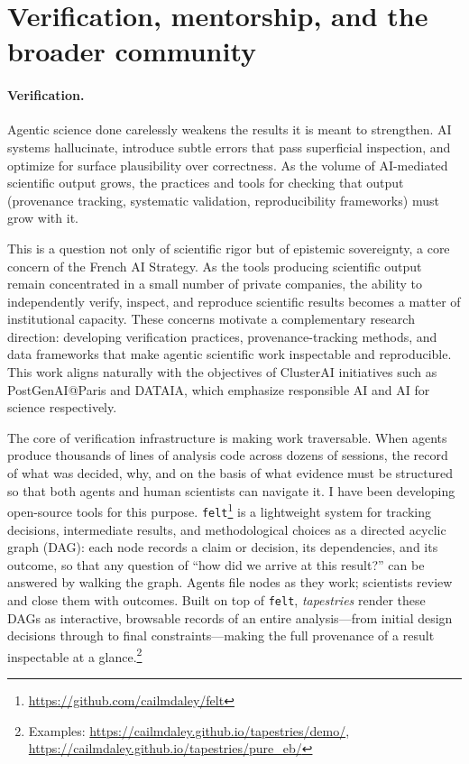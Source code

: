 \documentclass[11pt, a4paper]{article}
\begin{document}
\section{Verification, mentorship, and the broader community}

\paragraph{Verification.}
Agentic science done carelessly weakens the results it is meant to strengthen.
AI systems hallucinate, introduce subtle errors that pass superficial inspection, and optimize for surface plausibility over correctness.
As the volume of AI-mediated scientific output grows, the practices and tools for checking that output (provenance tracking, systematic validation, reproducibility frameworks) must grow with it.

This is a question not only of scientific rigor but of epistemic sovereignty, a core concern of the French AI Strategy.
As the tools producing scientific output remain concentrated in a small number of private companies, the ability to independently verify, inspect, and reproduce scientific results becomes a matter of institutional capacity.
These concerns motivate a complementary research direction: developing verification practices, provenance-tracking methods, and data frameworks that make agentic scientific work inspectable and reproducible.
This work aligns naturally with the objectives of ClusterAI initiatives such as PostGenAI@Paris and DATAIA, which emphasize responsible AI and AI for science respectively.

The core of verification infrastructure is making work traversable.
When agents produce thousands of lines of analysis code across dozens of sessions, the record of what was decided, why, and on the basis of what evidence must be structured so that both agents and human scientists can navigate it.
I have been developing open-source tools for this purpose.
\texttt{felt}\footnote{\url{https://github.com/cailmdaley/felt}} is a lightweight system for tracking decisions, intermediate results, and methodological choices as a directed acyclic graph (DAG): each node records a claim or decision, its dependencies, and its outcome, so that any question of ``how did we arrive at this result?'' can be answered by walking the graph.
Agents file nodes as they work; scientists review and close them with outcomes.
Built on top of \texttt{felt}, \emph{tapestries} render these DAGs as interactive, browsable records of an entire analysis---from initial design decisions through to final constraints---making the full provenance of a result inspectable at a glance.\footnote{Examples: \url{https://cailmdaley.github.io/tapestries/demo/}, \url{https://cailmdaley.github.io/tapestries/pure_eb/}}
\end{document}
